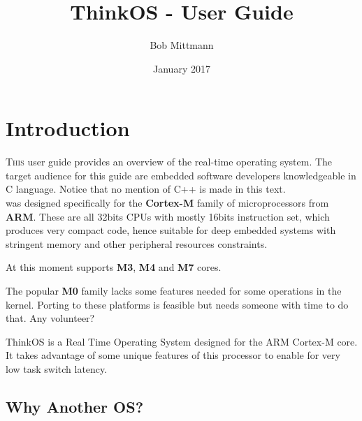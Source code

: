 

\makeatletter         
\title{ThinkOS - User Guide}
\author{Bob Mittmann}
\date{January 2017}
\def\email{bobmittmann@gmail.com} %
\def\therevision{0.1} %
\let\thetitle\@title %
\makeatother



\maketitle
\thispagestyle{empty}
\newpage
{}
\tableofcontents
\newpage
\listoffigures
\newpage
\listoftables
\newpage

\begin{versionhistory}
\end{versionhistory}

\newpage
{}

\section{Introduction}

\lettrine{T}{his} user guide provides an overview of the \ThinkOS real-time operating system. The target audience for this guide are embedded software developers knowledgeable in C language. Notice that no mention of C++ is made in this text.\\

\ThinkOS was designed specifically for the \textbf{Cortex-M} family of microprocessors from \textbf{ARM}. These are all 32bits CPUs with mostly 16bits instruction set, which produces very compact code, hence suitable for deep embedded systems with stringent memory and other peripheral resources constraints.

At this moment \ThinkOS supports \textbf{M3}, \textbf{M4} and \textbf{M7} cores.

The popular \textbf{M0} family lacks some features needed for some operations in the kernel. Porting to these platforms is feasible but needs someone with time to do that. Any volunteer?

ThinkOS is a Real Time Operating System designed for the ARM Cortex-M core. It takes advantage of some unique features of this processor to enable for very low task switch latency.


\subsection{Why Another OS?}

